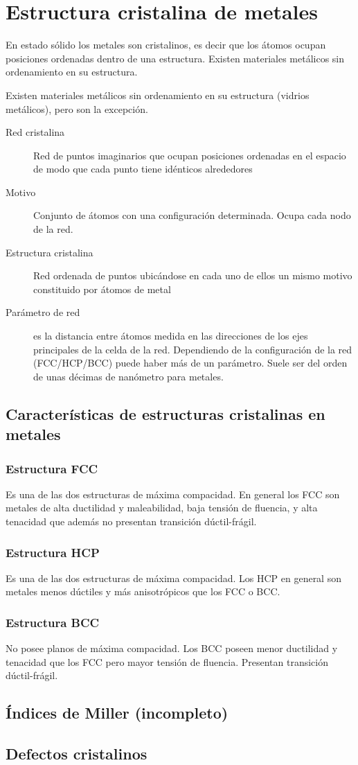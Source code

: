 \section{Estructura cristalina de metales}

En estado sólido los metales son cristalinos, es decir que los átomos ocupan posiciones ordenadas dentro de una estructura. Existen materiales metálicos sin ordenamiento en su estructura.

Existen materiales metálicos sin ordenamiento en su estructura (vidrios metálicos), pero son la excepción.

\begin{description}
    \item[Red cristalina] Red de puntos imaginarios que ocupan posiciones ordenadas en el espacio de modo que cada punto tiene idénticos alrededores
    \item[Motivo] Conjunto de átomos con una configuración determinada. Ocupa cada nodo de la red.
    \item[Estructura cristalina]  Red ordenada de puntos ubicándose en cada uno de ellos un mismo motivo constituido por átomos de metal
    \item[Parámetro de red] es la distancia entre átomos medida en las direcciones de los ejes principales de la celda de la red. Dependiendo de la configuración de la red (FCC/HCP/BCC) puede haber más de un parámetro. Suele ser del orden de unas décimas de nanómetro para metales.
\end{description}

\subsection{Características de estructuras cristalinas en metales}

\subsubsection{Estructura FCC}
Es una de las dos estructuras de máxima compacidad.
En general los FCC son metales de alta ductilidad y maleabilidad, baja tensión de fluencia, y alta tenacidad que además no presentan transición dúctil-frágil. 

\subsubsection{Estructura HCP}
Es una de las dos estructuras de máxima compacidad. Los HCP en general son metales menos dúctiles y más anisotrópicos que los FCC o BCC.


\subsubsection{Estructura BCC}
No posee planos de máxima compacidad. Los BCC poseen menor ductilidad y tenacidad que los FCC pero mayor tensión de fluencia. Presentan transición dúctil-frágil.

\subsection{Índices de Miller (incompleto)}

\subsection{Defectos cristalinos}

